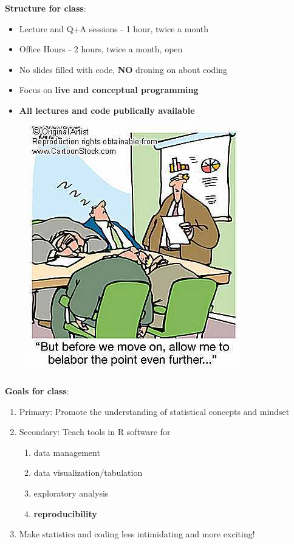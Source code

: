 \documentclass[xcolor=dvipsnames]{beamer}
\begin{document}
\begin{frame}
\frametitle{\insertsectionhead}
\textbf{Structure for class}:
\begin{itemize}
\item Lecture and Q+A sessions - 1 hour, twice a month
\item Office Hours - 2 hours, twice a month, open
\item No slides filled with code, \textbf{NO} droning on about coding
\item Focus on \textbf{live and conceptual programming}
\item \textbf{All lectures and code publically available}
\end{itemize}

\begin{figure}
\includegraphics[scale=1.25]{images/boring-lecture.jpg}
\end{figure}

\end{frame}

\begin{frame}
\frametitle{\insertsectionhead}
\textbf{Goals for class}:
\begin{enumerate}
\item Primary: Promote the understanding of statistical concepts and mindset
\item Secondary: Teach tools in R software for
\begin{enumerate}
\item data management
\item data visualization/tabulation
\item exploratory analysis
\item \textbf{reproducibility}
\end{enumerate}
\item Make statistics and coding less intimidating and more exciting!
\end{enumerate}
\end{frame}
\end{document}
